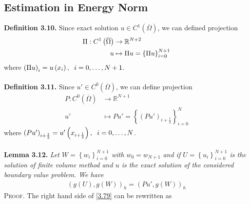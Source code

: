 \documentclass[a4paper]{article}
\numberwithin{equation}{section}
\begin{document}
\subsection{Estimation in Energy Norm}
\textbf{Definition 3.10.} Since exact solution $u \in {C^1}\left( {\overline \Omega  } \right)$, we can defined projection
\begin{align}
\Pi :{C^1}\left( {\overline \Omega  } \right) &\to {\mathbb{R}^{N + 2}}\\
u{\rm{ }} &\mapsto \Pi u = \left\{ {\Pi u} \right\}_{i = 0}^{N + 1}
\end{align}
where ${\left( {\Pi u} \right)_i} = u\left( {{x_i}} \right),\hspace{0.2cm}i = 0, \ldots ,N + 1$.\\
\\
\textbf{Definition 3.11.} Since $u' \in {C^0}\left( {\overline \Omega  } \right)$, we can define projection
\begin{align}
P:{C^0}\left( {\overline \Omega  } \right) &\to {\mathbb{R}^{N + 1}}\\
u' &\mapsto Pu'=\left\{ {{{\left( {Pu'} \right)}_{i + \frac{1}{2}}}} \right\}_{i = 0}^N
\end{align}
where ${\left( {Pu'} \right)_{i + \frac{1}{2}}} = u'\left( {{x_{i + \frac{1}{2}}}} \right),\hspace{0.2cm}i = 0, \ldots ,N$.\\
\\
\textbf{Lemma 3.12.} \textit{Let $W = \left\{ {{w_i}} \right\}_{i = 0}^{N + 1}$ with $w_0=w_{N+1}$ and if $U = \left\{ {{u_i}} \right\}_{i = 0}^{N + 1}$ is the solution of finite volume method and $u$ is the exact solution of the considered boundary value problem. We have}
\begin{align}
\label{3.79}
{\left( {g\left( U \right),g\left( W \right)} \right)_h} = {\left( {Pu',g\left( W \right)} \right)_h}
\end{align}
\textsc{Proof.} The right hand side of \eqref{3.79} can be rewritten as
\end{document}
